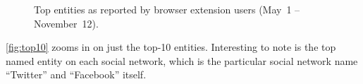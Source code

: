\documentclass{iosart2c}
\begin{document}
\begin{figure}
  \centering
    \qquad
\caption{Top entities as reported by browser extension users (May~1 -- November~12).}
\label{fig:topentities}
\end{figure}

\autoref{fig:top10} zooms in on just the top-10 entities.
Interesting to note is the top named entity on each social network, which is the particular social network name ``Twitter'' and ``Facebook'' itself. 
\end{document}
